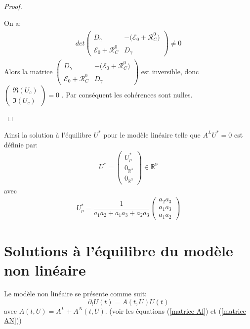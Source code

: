 \documentclass[12pt,a4paper,openany,oneside]{book}
\begin{document}
{{{{{{\begin{proof}
\begin{enumerate}
On a:
\begin{eqnarray*}
\begin{split}
det\begin{pmatrix}
   D_{\gamma}                &  -\big(\mathcal{E}_{0}+\mathcal{R}^{0}_{C}\big)  \\
   \mathcal{E}_{0}+ \mathcal{R}^{0}_{C}  &  D_{\gamma}
\end{pmatrix}\neq 0
\end{split}
\end{eqnarray*}
Alors la matrice $
\begin{pmatrix}
   D_{\gamma}                &  -\big(\mathcal{E}_{0}+\mathcal{R}^{0}_{C}\big)  \\
   \mathcal{E}_{0}+ \mathcal{R}^{0}_{C}  &  D_{\gamma}
\end{pmatrix}
$ est inversible, donc   \\
$ \begin{pmatrix} \Re(U_{c})\\ \Im(U_{c})\end{pmatrix}=0 $ . Par conséquent les cohérences sont nulles.

\end{enumerate}
\end{proof}

Ainsi la solution à l'équilibre $ U^{*}$ pour le modèle linéaire telle que  $  A^{L}U^{*}=0 $ est définie par:
\begin{eqnarray}
U^{*}= \begin{pmatrix}U_{p}^{*}\\ 0_{\mathbb{R}^{3}}\\ 0_{\mathbb{R}^{3}}\end{pmatrix} \in \mathbb{R}^{9}
\end{eqnarray}
avec
\begin{eqnarray*} 
U_{p}^{*} = \dfrac{1}{a_{1}a_{2}+a_{1}a_{3}+ a_{2}a_{3}}
\begin{pmatrix}     
a_{2}a_{3}\\
a_{1}a_{3}\\
a_{1}a_{2}
 \end{pmatrix}
  \end{eqnarray*}
  
  
 
\section{Solutions à l'équilibre du modèle non linéaire} 

Le modèle non linéaire se présente comme suit:
%
$$
\partial_{t}U(t) = A(t,U)U(t) 
$$
%
avec $ A(t,U)= A^{L}+ A^{N}(t,U).$ (voir les équations (\ref{matrice Al}) et (\ref{matrice AN})) \\

}}}}}}
\end{document}
